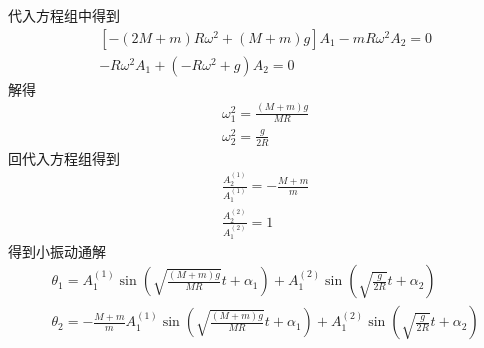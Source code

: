 \documentclass[10pt,a4paper]{article}
\begin{document}
代入方程组中得到
\begin{align*}
&[-(2M+m)R\omega^2+(M+m)g]A_1-mR\omega^2A_2=0\\
&-R\omega^2A_1+(-R\omega^2+g)A_2=0
\end{align*}
解得
\begin{align*}
&\omega_1^2=\frac{(M+m)g}{MR}\\
&\omega_2^2=\frac{g}{2R}
\end{align*}
回代入方程组得到
\begin{align*}
&\frac{A_2^{(1)}}{A_1^{(1)}}=-\frac{M+m}{m}\\
&\frac{A_2^{(2)}}{A_1^{(2)}}=1
\end{align*}
得到小振动通解
\begin{align*}
&\theta_1=A_1^{(1)}\sin(\sqrt{\frac{(M+m)g}{MR}}t+\alpha_1)+A_1^{(2)}\sin(\sqrt{\frac{g}{2R}}t+\alpha_2)\\
&\theta_2=-\frac{M+m}{m}A_1^{(1)}\sin(\sqrt{\frac{(M+m)g}{MR}}t+\alpha_1)+A_1^{(2)}\sin(\sqrt{\frac{g}{2R}}t+\alpha_2)
\end{align*}
\end{document}
